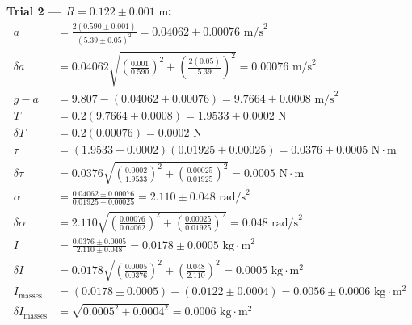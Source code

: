 \documentclass[11pt]{article}
\begin{document}
\textbf{Trial 2 — $R = 0.122 \pm 0.001\text{ m}$:}
\begin{align*}
a &= \frac{2(0.590 \pm 0.001)}{(5.39 \pm 0.05)^2} = 0.04062 \pm 0.00076\text{ m/s}^2 \\
\delta a &= 0.04062\sqrt{\left(\frac{0.001}{0.590}\right)^2 + \left(\frac{2(0.05)}{5.39}\right)^2} = 0.00076\text{ m/s}^2 \\
g - a &= 9.807 - (0.04062 \pm 0.00076) = 9.7664 \pm 0.0008\text{ m/s}^2 \\
T &= 0.2(9.7664 \pm 0.0008) = 1.9533 \pm 0.0002\text{ N} \\
\delta T &= 0.2(0.00076) = 0.0002\text{ N} \\
\tau &= (1.9533 \pm 0.0002)(0.01925 \pm 0.00025) = 0.0376 \pm 0.0005\text{ N}\cdot\text{m} \\
\delta\tau &= 0.0376\sqrt{\left(\frac{0.0002}{1.9533}\right)^2 + \left(\frac{0.00025}{0.01925}\right)^2} = 0.0005\text{ N}\cdot\text{m} \\
\alpha &= \frac{0.04062 \pm 0.00076}{0.01925 \pm 0.00025} = 2.110 \pm 0.048\text{ rad/s}^2 \\
\delta\alpha &= 2.110\sqrt{\left(\frac{0.00076}{0.04062}\right)^2 + \left(\frac{0.00025}{0.01925}\right)^2} = 0.048\text{ rad/s}^2 \\
I &= \frac{0.0376 \pm 0.0005}{2.110 \pm 0.048} = 0.0178 \pm 0.0005\text{ kg}\cdot\text{m}^2 \\
\delta I &= 0.0178\sqrt{\left(\frac{0.0005}{0.0376}\right)^2 + \left(\frac{0.048}{2.110}\right)^2} = 0.0005\text{ kg}\cdot\text{m}^2 \\
I_{\text{masses}} &= (0.0178 \pm 0.0005) - (0.0122 \pm 0.0004) = 0.0056 \pm 0.0006\text{ kg}\cdot\text{m}^2 \\
\delta I_{\text{masses}} &= \sqrt{0.0005^2 + 0.0004^2} = 0.0006\text{ kg}\cdot\text{m}^2
\end{align*}
\end{document}
